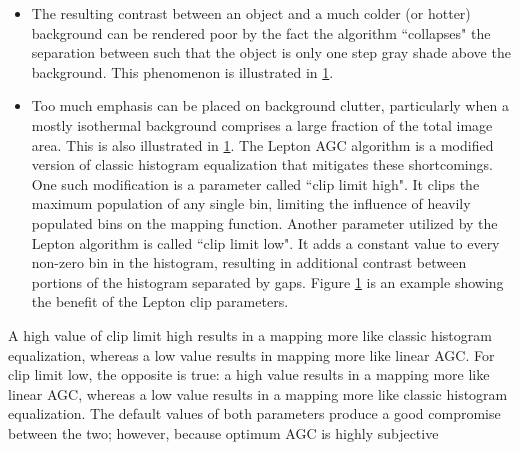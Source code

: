 \begin{itemize}
    \item The resulting contrast between an object and a much colder (or hotter)
background can be rendered poor by the fact the algorithm ``collapses" the
separation between such that the object is only one step gray shade above the
background. This phenomenon is illustrated in \ref{fig:comparisionlinearAGC}.
    \item Too much emphasis can be placed on background clutter, particularly
when a mostly isothermal background comprises a large fraction of the total
image area. This is also illustrated in \ref{fig:comparisionlinearAGC}. The
Lepton AGC algorithm is a modified version of classic histogram equalization
that mitigates these shortcomings. One such modification is a parameter called
``clip limit high". It clips the maximum population of any single bin, limiting
the influence of heavily populated bins on the mapping function. Another
parameter utilized by the Lepton algorithm is called ``clip limit low". It adds
a constant value to every non-zero bin in the histogram, resulting in additional
contrast between portions of the histogram separated by gaps. Figure
\ref{fig:comparisionlinearAGC} is an example showing the benefit of the Lepton
clip parameters.
%
\end{itemize}
\begin{figure}[htb]
    \centering
     \quad
     \quad
    \label{fig:comparisionlinearAGC}
\end{figure}
%
\newpage A high value of clip limit high results in a mapping more like classic histogram
equalization, whereas a low value results in mapping more like linear AGC. For
clip limit low, the opposite is true: a high value results in a mapping more
like linear AGC, whereas a low value results in a mapping more like classic
histogram equalization. The default values of both parameters produce a good
compromise between the two; however, because optimum AGC is highly subjective
